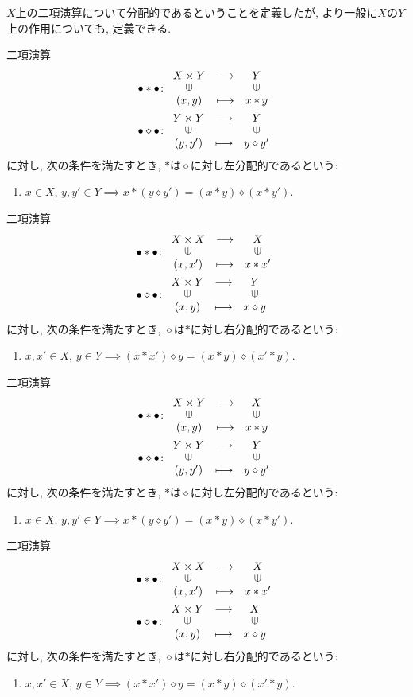 $X$上の二項演算について分配的であるということを定義したが,
より一般に$X$の$Y$上の作用についても, 定義できる.
\begin{definition}
  二項演算
  \begin{align*}
    \bullet \ast \bullet &\colon
    \Shazo{X\times Y}{Y}{(x,y)}{x\ast y}\\
    \bullet \diamond \bullet &\colon
    \Shazo{Y\times Y}{Y}{(y,y')}{y\diamond y'}
  \end{align*}
  に対し,
  次の条件を満たすとき,
  $\ast$は$\diamond$に対し左分配的であるという:
  \begin{enumerate}
  \item $x\in X$, $y,y'\in Y \implies x\ast (y\diamond y')=(x\ast y)\diamond (x\ast y')$.
  \end{enumerate}
\end{definition}
\begin{definition}
  二項演算
  \begin{align*}
    \bullet \ast \bullet &\colon
    \Shazo{X\times X}{X}{(x,x')}{x\ast x'}\\
    \bullet \diamond \bullet &\colon
    \Shazo{X\times Y}{Y}{(x,y)}{x\diamond y}
  \end{align*}
  に対し,
  次の条件を満たすとき,
  $\diamond$は$\ast$に対し右分配的であるという:
  \begin{enumerate}
  \item $x,x'\in X$, $y\in Y \implies (x\ast x')\diamond y=(x\ast y)\diamond (x'\ast y)$.
  \end{enumerate}
\end{definition}
\begin{definition}
  二項演算
  \begin{align*}
    \bullet \ast \bullet &\colon
    \Shazo{X\times Y}{X}{(x,y)}{x\ast y}\\
    \bullet \diamond \bullet &\colon
    \Shazo{Y\times Y}{Y}{(y,y')}{y\diamond y'}
  \end{align*}
  に対し,
  次の条件を満たすとき,
  $\ast$は$\diamond$に対し左分配的であるという:
  \begin{enumerate}
  \item $x\in X$, $y,y'\in Y \implies x\ast (y\diamond y')=(x\ast y)\diamond (x\ast y')$.
  \end{enumerate}
\end{definition}
\begin{definition}
  二項演算
  \begin{align*}
    \bullet \ast \bullet &\colon
    \Shazo{X\times X}{X}{(x,x')}{x\ast x'}\\
    \bullet \diamond \bullet &\colon
    \Shazo{X\times Y}{X}{(x,y)}{x\diamond y}
  \end{align*}
  に対し,
  次の条件を満たすとき,
  $\diamond$は$\ast$に対し右分配的であるという:
  \begin{enumerate}
  \item $x,x'\in X$, $y\in Y \implies (x\ast x')\diamond y=(x\ast y)\diamond (x'\ast y)$.
  \end{enumerate}
\end{definition}




